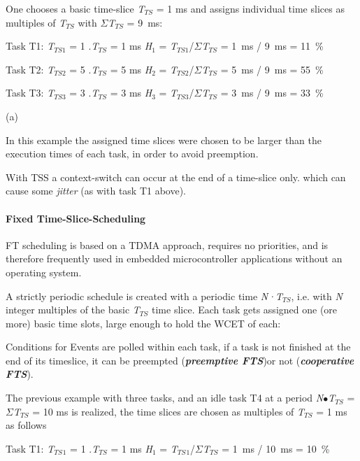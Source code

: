 One chooses a basic time-slice \textit{T}${}_{TS}$ = 1 ms and assigns individual time slices as multiples of \textit{T}${}_{TS}$ with $\Sigma$\textit{T}${}_{TS}$ = 9~ms:

Task T1:    \textit{T}${}_{TS1}$ = 1 $.$\textit{T}${}_{TS}$ = 1 ms  \textit{H}${}_{1}$ = \textit{T}${}_{TS1}$/$\Sigma$\textit{T}${}_{TS}$ = 1~ms / 9~ms = 11~\%

Task T2:    \textit{T}${}_{TS2}$ = 5 $.$\textit{T}${}_{TS}$ = 5 ms  \textit{H}${}_{2}$ = \textit{T}${}_{TS2}$/$\Sigma$\textit{T}${}_{TS}$ = 5~ms / 9~ms = 55~\%

Task T3:     \textit{T}${}_{TS3}$ = 3 $.$\textit{T}${}_{TS}$ = 3 ms  \textit{H}${}_{3}$ = \textit{T}${}_{TS3}$/$\Sigma$\textit{T}${}_{TS}$ = 3~ms / 9~ms = 33~\%

(a)

In this example the assigned time slices were chosen to be larger than the execution times of each task, in order to avoid preemption.

With TSS a context-switch can occur at the end of a time-slice only. which can cause some \textit{jitter} (as with task T1 above).

\paragraph{ Fixed Time-Slice-Scheduling }

FT scheduling is based on a TDMA approach, requires no priorities, and is therefore frequently used in embedded microcontroller applications without an operating system.

A strictly periodic schedule is created with a periodic time \textit{N·T${}_{TS}$}, i.e. with \textit{N} integer multiples of the basic \textit{T${}_{TS}$} time slice. Each task gets assigned one (ore more) basic time slots, large enough to hold the WCET of each:

Conditions for Events are polled within each task, if a task is not finished at the end of its timeslice, it can be preempted (\textbf{\textit{preemptive FTS}})or not (\textbf{\textit{cooperative FTS}}).

The previous example with three tasks, and an idle task T4 at a period \textit{N}$\mathrm{\bullet}$\textit{T${}_{TS}$} = $\Sigma$\textit{T${}_{TS}$} = 10 ms is realized, the time slices are chosen as multiples of \textit{T${}_{TS}$} = 1 ms as follows 

Task T1:    \textit{T${}_{TS}$}${}_{1}$ = 1 $.$\textit{T${}_{TS}$} = 1 ms  \textit{H}${}_{1}$ = \textit{T${}_{TS}$}${}_{1}$/$\Sigma$\textit{T${}_{TS}$} = 1~ms / 10~ms = 10~\%

